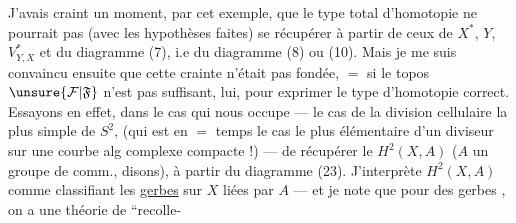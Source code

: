 J'avais craint un moment, par cet exemple,
que le type total d'homotopie  ne pourrait
pas (avec les hypothèses  faites) se récupérer
à partir de ceux de $X^*$, $Y$, $V^*_{Y,X}$ et du
diagramme (7), i.e du diagramme (8)
ou (10). Mais je me suis convaincu ensuite
que cette crainte n'était pas fondée, $=$ si
le topos $\unsure{\mathcal F|\mathfrak F}$ n'est pas suffisant, lui, pour
exprimer le type d'homotopie correct.
Essayons en effet, dans le cas qui nous
occupe --- le cas de la division cellulaire
la plus simple de $S^2$, (qui est en $=$ temps
le cas le plus  élémentaire d'un
diviseur sur une courbe alg complexe
compacte !) --- de récupérer le $H^2(X,A)$
($A$ un groupe de  comm., disons),
à partir du diagramme (23). J'interprète
$H^2(X,A)$ comme classifiant les \uline{gerbes} sur
$X$ liées par $A$ --- et je note que pour des
 gerbes , on a une théorie de ``recolle-
